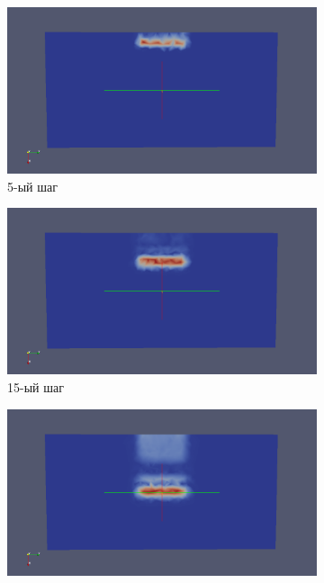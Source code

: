 \begin{figure}[H]
\begin{subfigure}[b]{0.5\textwidth}
\centering
\includegraphics[width=1.0\textwidth]{png/two-graphite-layers/xz5.png}
\caption{5-ый шаг}
\end{subfigure}
\begin{subfigure}[b]{0.5\textwidth}
\centering
\includegraphics[width=1.0\textwidth]{png/two-graphite-layers/xz15.png}
\caption{15-ый шаг}
\end{subfigure}
\begin{subfigure}[b]{0.5\textwidth}
\centering
\includegraphics[width=1.0\textwidth]{png/two-graphite-layers/xz30.png}

\end{subfigure}
\end{figure}
